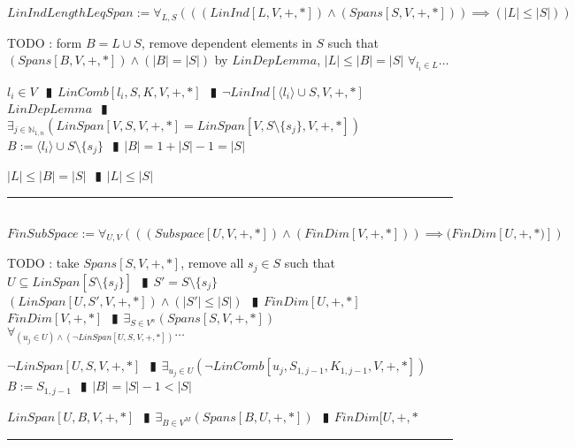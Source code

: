 \documentclass{book}
\newcommand{\abr}{:=}
\newcommand{\pipe}{$\phantom{(}\vrectangleblack\phantom{)}$}
\newcommand{\pr}[1]{\left(#1\right)}
\begin{document}
\begin{shaded} %
$LinIndLengthLeqSpan \abr \forall_{L, S}\pr{\pr{(LinInd[L, V, +, *]) \land (Spans[S, V, +, *])} \implies (|L| \leq |S|)}$
\begin{enumerate}
  \lit TODO : form $B = L \cup S$, remove dependent elements in $S$ such that \\
    $(Spans[B, V, +, *]) \land (|B| = |S|)$ by $LinDepLemma$, $|L| \leq |B| = |S|$
  \lit $\forall_{l_i \in L} \ldots$
  \begin{enumerate}
    \lit $l_i \in V$ \pipe $LinComb[l_i, S, K, V, +, *]$ \pipe $\lnot LinInd[\langle l_i \rangle \cup S, V, +, *]$
    \lit $LinDepLemma$ \pipe $\exists_{j \in \mathbb{N}_{1, n}}(LinSpan[V, S, V, +, *] = LinSpan[V, S \setminus \{s_j\}, V, +, *])$
    \lit $B \abr \langle l_i \rangle \cup S \setminus \{s_j\}$ \pipe $|B| = 1 + |S| - 1 = |S|$
  \end{enumerate}
  \lit $|L| \leq |B| = |S|$ \pipe $|L| \leq |S|$
\end{enumerate} \vspace{.75mm} \hrule \vspace{.75mm} \ \\ 

$FinSubSpace \abr \forall_{U, V}\pr{\pr{(Subspace[U, V, +, *])\land (FinDim[V, +, *])} \implies (FinDim[U, +, *)]}$
\begin{enumerate}
  \lit TODO : take $Spans[S, V, +, *]$, remove all $s_j \in S$ such that $U \subseteq LinSpan[S \setminus \{s_j\}]$ \pipe $S' = S \setminus \{s_j\}$ \\
    $(LinSpan[U, S', V, +, *]) \land (|S'| \leq |S|)$ \pipe $FinDim[U, +, *]$
  \lit $FinDim[V, +, *]$ \pipe $\exists_{S \in V^n}(Spans[S, V, +, *])$
  \lit $\forall_{(u_j \in U) \land (\lnot LinSpan[U, S, V, +, *])} \ldots$
  \begin{enumerate}
    \lit $\lnot LinSpan[U, S, V, +, *]$ \pipe $\exists_{u_j \in U}(\lnot LinComb[u_j, S_{1, j - 1}, K_{1, j - 1}, V, +, *])$
    \lit $B \abr S_{1, j - 1}$ \pipe $|B| = |S| - 1 < |S|$
  \end{enumerate}
  \lit $LinSpan[U, B, V, +, *]$ \pipe $\exists_{B \in V^M}(Spans[B, U, +, *])$ \pipe $FinDim[U, +, *$
\end{enumerate} \vspace{.75mm} \hrule \vspace{.75mm} \ \\ 
\end{shaded} %
\end{document}
